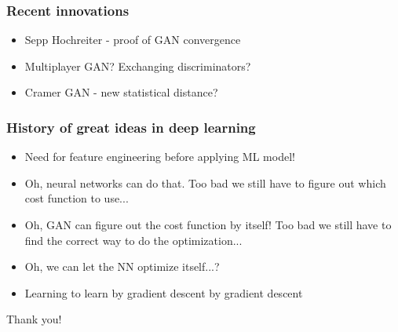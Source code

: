 \documentclass{Bredelebeamer}
\begin{document}
\begin{frame}
	\frametitle{Recent innovations}
	\begin{itemize}
		\item Sepp Hochreiter - proof of GAN convergence
		\item Multiplayer GAN? Exchanging discriminators?
		\item Cramer GAN - new statistical distance?
	\end{itemize}
\end{frame}

\begin{frame}
\frametitle{History of great ideas in deep learning}

\begin{itemize}
	\item Need for feature engineering before applying ML model!
	\item Oh, neural networks can do that. Too bad we still have to figure out which cost function to use...
	\item Oh, GAN can figure out the cost function by itself! Too bad we still have to find the correct way to do the optimization...
	\item Oh, we can let the NN optimize itself...?
	\item Learning to learn by gradient descent by gradient descent
\end{itemize}

\end{frame}



\begin{frame}
\Huge{\centerline{Thank you!}}
\end{frame}

\end{document}
